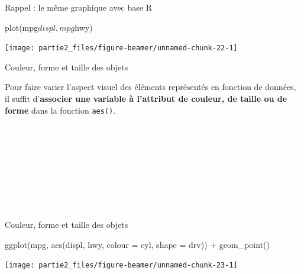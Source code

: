 \documentclass[12pt,ignorenonframetext,]{beamer}
\newenvironment{Shaded}{}{}
\newcommand{\DataTypeTok}[1]{#1}
\newcommand{\KeywordTok}[1]{\textcolor[rgb]{0.00,0.00,1.00}{#1}}
\newcommand{\NormalTok}[1]{#1}
\newcommand{\OperatorTok}[1]{#1}
\newcommand{\StringTok}[1]{\textcolor[rgb]{0.00,0.50,0.50}{#1}}
\renewenvironment{Shaded}{\begin{snugshade}}{\end{snugshade}}
\begin{document}
\begin{frame}[fragile]{\large Rappel : le même graphique avec base R}
\protect\hypertarget{rappel-le-meme-graphique-avec-base-r}{}

\centering \footnotesize

\begin{Shaded}
\begin{Highlighting}[]
\KeywordTok{plot}\NormalTok{(mpg}\OperatorTok{$}\NormalTok{displ, mpg}\OperatorTok{$}\NormalTok{hwy)}
\end{Highlighting}
\end{Shaded}

\texttt{[image: partie2\_files/figure-beamer/unnamed-chunk-22-1]}

\end{frame}

\begin{frame}{Couleur, forme et taille des objets}
\protect\hypertarget{couleur-forme-et-taille-des-objets-3}{}

Pour faire varier l’aspect visuel des éléments représentés en fonction
de données, il suffit
d’\textbf{associer une variable à l'attribut de couleur, de taille ou de forme}
dans la fonction \texttt{aes()}.

\textcolor{white}{Selon le type des variables utilisées pour les correspondances esthétiques, \textbf{les échelles sont continues ou discrètes}.}

\textcolor{white}{Quand la même variable est utilisée dans plusieurs correspondances esthétiques, \textbf{les échelles qui lui correspondent sont fusionnées}.}

\textcolor{white}{Au-delà des correspondances esthétiques dans la fonction \texttt{aes()}, \textbf{l'aspect visuel peut être ajusté directement dans la fonction \texttt{geom\_*}}.}

\end{frame}

\begin{frame}[fragile]{Couleur, forme et taille des objets}
\protect\hypertarget{couleur-forme-et-taille-des-objets-4}{}

\footnotesize \center

\begin{Shaded}
\begin{Highlighting}[]
\KeywordTok{ggplot}\NormalTok{(mpg, }\KeywordTok{aes}\NormalTok{(displ, hwy, }\DataTypeTok{colour =}\NormalTok{ cyl, }\DataTypeTok{shape =}\NormalTok{ drv)) }\OperatorTok{+}
\StringTok{  }\KeywordTok{geom_point}\NormalTok{()}
\end{Highlighting}
\end{Shaded}

\texttt{[image: partie2\_files/figure-beamer/unnamed-chunk-23-1]}

\end{frame}
\end{document}
